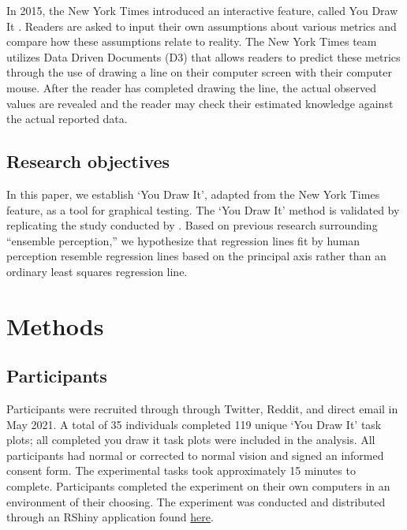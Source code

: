 \documentclass[12pt]{article}
\begin{document}
In 2015, the New York Times introduced an interactive feature, called
You Draw It
\citep{aisch_cox_quealy_2015, buchanan_park_pearce_2017, katz_2017}.
Readers are asked to input their own assumptions about various metrics
and compare how these assumptions relate to reality. The New York Times
team utilizes Data Driven Documents (D3) that allows readers to predict
these metrics through the use of drawing a line on their computer screen
with their computer mouse. After the reader has completed drawing the
line, the actual observed values are revealed and the reader may check
their estimated knowledge against the actual reported data.

\hypertarget{research-objectives}{%
\subsection{Research objectives}\label{research-objectives}}

In this paper, we establish `You Draw It', adapted from the New York
Times feature, as a tool for graphical testing. The `You Draw It' method
is validated by replicating the study conducted by
\citet{mosteller1981eye}. Based on previous research surrounding
``ensemble perception,'' we hypothesize that regression lines fit by
human perception resemble regression lines based on the principal axis
rather than an ordinary least squares regression line.

\hypertarget{methods}{%
\section{Methods}\label{methods}}

\hypertarget{participants}{%
\subsection{Participants}\label{participants}}

Participants were recruited through through Twitter, Reddit, and direct
email in May 2021. A total of 35 individuals completed 119 unique `You
Draw It' task plots; all completed you draw it task plots were included
in the analysis. All participants had normal or corrected to normal
vision and signed an informed consent form. The experimental tasks took
approximately 15 minutes to complete. Participants completed the
experiment on their own computers in an environment of their choosing.
The experiment was conducted and distributed through an RShiny
application found
\href{https://shiny.srvanderplas.com/you-draw-it/}{here}.
\end{document}
